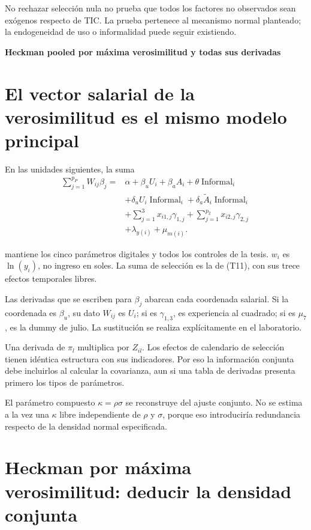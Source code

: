 \documentclass[11pt,a4paper]{article}
\begin{document}
No rechazar selección nula no prueba que todos los factores no observados sean exógenos respecto de TIC. La prueba pertenece al mecanismo normal planteado; la endogeneidad de uso o informalidad puede seguir existiendo.

\clearpage
{}
{\large\bfseries\color{azul}Heckman pooled por máxima verosimilitud y todas sus derivadas}\par\vspace{2mm}
\section{El vector salarial de la verosimilitud es el mismo modelo principal}
En las unidades siguientes, la suma 
\[
\begin{aligned}\sum_{j=1}^{p_P}W_{ij}\beta_j={}&\alpha+\beta_uU_i+\beta_aA_i+\theta\operatorname{Informal}_i\\
&+\delta_uU_i\operatorname{Informal}_i+\delta_a\widetilde A_i\operatorname{Informal}_i\\
&+\sum_{j=1}^{3}x_{i1,j}\gamma_{1,j}+\sum_{j=1}^{p_2}x_{i2,j}\gamma_{2,j}\\
&+\lambda_{y(i)}+\mu_{m(i)}.\end{aligned}
\]

mantiene los cinco parámetros digitales y todos los controles de la tesis. $w_i$ es $\ln(y_i)$, no ingreso en soles. La suma de selección es la de (T11), con sus trece efectos temporales libres.

Las derivadas que se escriben para $\beta_j$ abarcan cada coordenada salarial. Si la coordenada es $\beta_u$, su dato $W_{ij}$ es $U_i$; si es $\gamma_{1,3}$, es experiencia al cuadrado; si es $\mu_7$, es la dummy de julio. La sustitución se realiza explícitamente en el laboratorio.

Una derivada de $\pi_l$ multiplica por $Z_{il}$. Los efectos de calendario de selección tienen idéntica estructura con sus indicadores. Por eso la información conjunta debe incluirlos al calcular la covarianza, aun si una tabla de derivadas presenta primero los tipos de parámetros.

El parámetro compuesto $\kappa=\rho\sigma$ se reconstruye del ajuste conjunto. No se estima a la vez una $\kappa$ libre independiente de $\rho$ y $\sigma$, porque eso introduciría redundancia respecto de la densidad normal especificada.

\clearpage
\section{Heckman por máxima verosimilitud: deducir la densidad conjunta}
\end{document}
